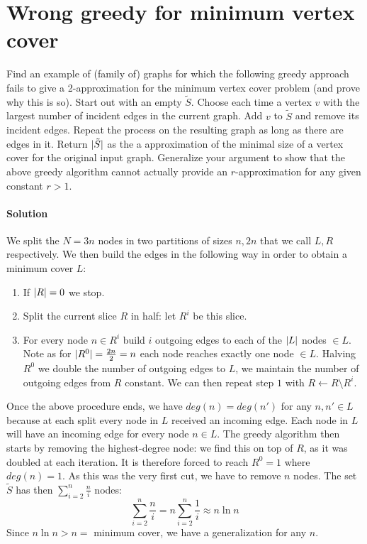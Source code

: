 \section{Wrong greedy for minimum vertex cover}

Find an example of (family of) graphs for which the following greedy approach fails to give a 2-approximation for the minimum vertex cover problem (and prove why this is so). 
Start out with an empty $\tilde{S}$.
Choose each time a vertex $v$ with the largest number of incident edges in the current graph.
Add $v$ to $\tilde{S}$ and remove its incident edges.
Repeat the process on the resulting graph as long as there are edges in it.
Return $\lvert\tilde{S}\rvert$ as the a approximation of the minimal size of a vertex cover for the original input graph.
Generalize your argument to show that the above greedy algorithm cannot actually provide an
$r$-approximation for any given constant $r >1$.

\paragraph{Solution}
We split the $N = 3n$ nodes in two partitions of sizes $n, 2n$ that we call $L, R$ respectively.
We then build the edges in the following way in order to obtain a minimum cover $L$:
	\begin{enumerate}
	\item If $\lvert R\rvert = 0$ we stop.
	\item Split the current slice $R$ in half: let $R^i$ be this slice.
	\item For every node $n \in R^i$ build $i$ outgoing edges to each of the $\lvert L\rvert$ nodes $\in L$.
	Note as for $\lvert R^0\rvert = \frac{2n}{2} = n$ each node reaches exactly one node $\in L$.
	Halving $R^0$ we double the number of outgoing edges to $L$, we maintain the number of outgoing edges from $R$ constant.
	We can then repeat step $1$ with $R \gets R \setminus R^i$.
	\end{enumerate}
Once the above procedure ends, we have $deg(n) = deg(n') $ for any $n, n' \in L$ because at each split every node in $L$ received an incoming edge.
Each node in $L$ will have an incoming edge for every node $n \in L$.
The greedy algorithm then starts by removing the highest-degree node: we find this on top of $R$, as it was doubled at each iteration.
It is therefore forced to reach $R^0 = 1$ where $deg(n) = 1$.
As this was the very first cut, we have to remove $n$ nodes.
The set $\tilde{S}$ has then $\sum_{i = 2}^{n}\frac{n}{i}$ nodes:
	\begin{equation*}
	\sum_{i = 2}^{n}\frac{n}{i} = n \sum_{i = 2}^{n}\frac{1}{i} \approx n \ln n
	\end{equation*}
Since $n \ln n > n = $ minimum cover, we have a generalization for any $n$.